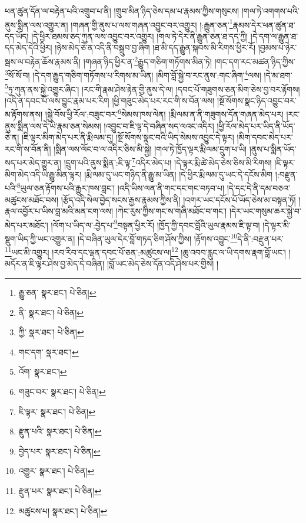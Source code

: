 ཕན་ཚུན་དོན་ལ་བརྟེན་པའི་འགྲུབ་པ་ནི། །གྲུབ་མིན་ཉིད་ཅེས་དམ་པ་རྣམས་ཀྱིས་གསུངས། །གལ་ཏེ་འགགས་པའི་ནུས་སྨིན་ལས་འགྱུར་ན། །གཞན་གྱི་ནུས་པ་ལས་གཞན་འབྱུང་བར་འགྱུར། །:རྒྱུན་ཅན་\footnote{རྒྱུ་ཅན་  སྣར་ཐང་།  པེ་ཅིན། }རྣམས་དེར་ཕན་ཚུན་ཐ་དད་ཡོད། །དེ་ཕྱིར་ཐམས་ཅད་ཀུན་ལས་འབྱུང་བར་འགྱུར། །གལ་ཏེ་དེར་ནི་རྒྱུན་ཅན་ཐ་དད་ཀྱི། །དེ་དག་ལ་རྒྱུན་ཐ་དད་མེད་དེའི་ཕྱིར། །ཉེས་མེད་ཅེ་ན་འདི་ནི་བསྒྲུབ་བྱ་ཞིག །ཐ་མི་དད་རྒྱུན་སྐབས་མི་རིགས་ཕྱིར་རོ། །བྱམས་པ་ཉེར་སྦས་ལ་བརྟེན་ཆོས་རྣམས་ནི། །གཞན་ཉིད་ཕྱིར་ན་\footnote{ནི་  སྣར་ཐང་།  པེ་ཅིན། }རྒྱུད་གཅིག་གཏོགས་མིན་ཏེ། །གང་དག་རང་མཚན་ཉིད་ཀྱིས་\footnote{ཀྱི་  སྣར་ཐང་།  པེ་ཅིན། }སོ་སོ་བ། །དེ་དག་རྒྱུད་གཅིག་གཏོགས་པ་རིགས་མ་ཡིན། །མིག་བློ་སྐྱེ་བ་རང་ནུས་:གང་ཞིག་\footnote{གང་དག་  སྣར་ཐང་། }ལས། །དེ་མ་ཐག་\footnote{འོག་  སྣར་ཐང་། }ཏུ་ཀུན་ནས་སྐྱེ་འགྱུར་ཞིང་། །རང་གི་རྣམ་ཤེས་རྟེན་གྱི་ནུས་དེ་ལ། །དབང་པོ་གཟུགས་ཅན་མིག་ཅེས་བྱ་བར་རྟོགས། །འདི་ན་དབང་པོ་ལས་བྱུང་རྣམ་པར་རིག །ཕྱི་གཟུང་མེད་པར་རང་གི་ས་བོན་ལས། །སྔོ་སོགས་སྣང་ཉིད་འབྱུང་བར་མ་རྟོགས་ནས། །སྐྱེ་བོས་ཕྱི་རོལ་:བཟུང་བར་\footnote{གཟུང་བར་  སྣར་ཐང་།  པེ་ཅིན། }སེམས་ཁས་ལེན། །རྨི་ལམ་ན་ནི་གཟུགས་དོན་གཞན་མེད་པར། །རང་ནུས་སྨིན་ལས་དེ་ཡི་རྣམ་ཅན་སེམས། །འབྱུང་བ་ཇི་ལྟ་དེ་བཞིན་སད་ལའང་འདིར། །ཕྱི་རོལ་མེད་པར་ཡིད་ནི་ཡོད་ཅེ་ན། །ཇི་ལྟར་མིག་མེད་པར་ནི་རྨི་ལམ་དུ། །སྔོ་སོགས་སྣང་བའི་ཡིད་སེམས་འབྱུང་དེ་ལྟར། །མིག་དབང་མེད་པར་རང་གི་ས་བོན་ནི། །སྨིན་ལས་ལོང་བ་ལ་འདིར་ཅིས་མི་སྐྱེ། །གལ་ཏེ་ཁྱོད་ལྟར་རྨི་ལམ་དྲུག་པ་ཡི། །ནུས་པ་སྨིན་ཡོད་སད་པར་མེད་གྱུར་ན། །དྲུག་པའི་ནུས་སྨིན་:ཇི་ལྟ་\footnote{ཇི་ལྟར་  སྣར་ཐང་།  པེ་ཅིན། }འདིར་མེད་པ། །དེ་ལྟར་རྨི་ཚེ་མེད་ཅེས་ཅིས་མི་རིགས། །ཇི་ལྟར་མིག་མེད་འདི་ཡི་རྒྱུ་མིན་ལྟར། །རྨི་ལམ་དུ་ཡང་གཉིད་ནི་རྒྱུ་མ་ཡིན། །དེ་ཕྱིར་རྨི་ལམ་དུ་ཡང་དེ་དངོས་མིག །:བརྫུན་པའི་\footnote{རྫུན་པའི་  སྣར་ཐང་།  པེ་ཅིན། }ཡུལ་ཅན་རྟོགས་པའི་རྒྱུར་ཁས་བླང་། །འདི་ཡིས་ལན་ནི་གང་དང་གང་བཏབ་པ། །དེ་དང་དེ་ནི་དམ་བཅའ་མཚུངས་མཐོང་བས། །རྩོད་འདི་སེལ་བྱེད་སངས་རྒྱས་རྣམས་ཀྱིས་ནི། །འགར་ཡང་དངོས་པོ་ཡོད་ཅེས་མ་བསྟན་ཏོ། །རྣལ་འབྱོར་པ་ཡིས་བླ་མའི་མན་ངག་ལས། །ཀེང་རུས་ཀྱིས་གང་ས་གཞི་མཐོང་བ་གང་། །དེར་ཡང་གསུམ་ཆར་སྐྱེ་བ་མེད་པར་མཐོང་། །ལོག་པ་ཡིད་ལ་:བྱེད་པ་\footnote{བྱེད་པར་  སྣར་ཐང་།  པེ་ཅིན། }བསྟན་ཕྱིར་རོ། །ཁྱོད་ཀྱི་དབང་བློའི་ཡུལ་རྣམས་ཇི་ལྟ་བ། །དེ་ལྟར་མི་སྡུག་ཡིད་ཀྱི་ཡང་འགྱུར་ན། །དེ་བཞིན་ཡུལ་དེར་བློ་གཏད་ཅིག་ཤོས་ཀྱིས། །རྟོགས་འབྱུང་\footnote{འགྱུར་  སྣར་ཐང་།  པེ་ཅིན། }དེ་ནི་:བརྫུན་པར་\footnote{རྫུན་པར་  སྣར་ཐང་།  པེ་ཅིན། }ཡང་མི་འགྱུར། །རབ་རིབ་དང་ལྡན་དབང་པོ་ཅན་:མཚུངས་ལ།\footnote{མཚུངས་པ།  སྣར་ཐང་།  པེ་ཅིན། } །ཆུ་འབབ་རླུང་ལ་ཡི་དགས་རྣག་བློ་ཡང་། །མདོར་ན་ཇི་ལྟར་ཤེས་བྱ་མེད་དེ་བཞིན། །བློ་ཡང་མེད་ཅེས་དོན་འདི་ཤེས་པར་གྱིས། །
